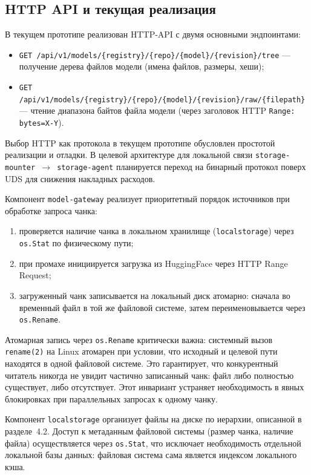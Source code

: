 \subsection*{HTTP API и текущая реализация}

В текущем прототипе реализован HTTP-API с двумя основными эндпоинтами:

\begin{itemize}[leftmargin=*]
  \item \texttt{GET /api/v1/models/\{registry\}/\{repo\}/\{model\}/\{revision\}/tree} --- получение дерева файлов модели (имена файлов, размеры, хеши);
  \item \texttt{GET /api/v1/models/\{registry\}/\{repo\}/\{model\}/\{revision\}/raw/\{filepath\}} --- чтение диапазона байтов файла модели (через заголовок HTTP \texttt{Range: bytes=X-Y}).
\end{itemize}

Выбор HTTP как протокола в текущем прототипе обусловлен простотой реализации и отладки. В целевой архитектуре для локальной связи \texttt{storage-mounter $\to$ storage-agent} планируется переход на бинарный протокол поверх UDS для снижения накладных расходов.

Компонент \texttt{model-gateway} реализует приоритетный порядок источников при обработке запроса чанка:
\begin{enumerate}[leftmargin=*]
  \item проверяется наличие чанка в локальном хранилище (\texttt{localstorage}) через \texttt{os.Stat} по физическому пути;
  \item при промахе инициируется загрузка из HuggingFace через HTTP Range Request;
  \item загруженный чанк записывается на локальный диск атомарно: сначала во временный файл в той же файловой системе, затем переименовывается через \texttt{os.Rename}.
\end{enumerate}

Атомарная запись через \texttt{os.Rename} критически важна: системный вызов \texttt{rename(2)} на Linux атомарен при условии, что исходный и целевой пути находятся в одной файловой системе. Это гарантирует, что конкурентный читатель никогда не увидит частично записанный чанк: файл либо полностью существует, либо отсутствует. Этот инвариант устраняет необходимость в явных блокировках при параллельных запросах к одному чанку.

Компонент \texttt{localstorage} организует файлы на диске по иерархии, описанной в разделе~4.2. Доступ к метаданным файловой системы (размер чанка, наличие файла) осуществляется через \texttt{os.Stat}, что исключает необходимость отдельной локальной базы данных: файловая система сама является индексом локального кэша.

